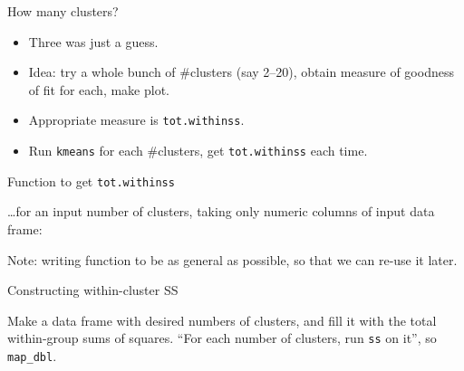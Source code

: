 \documentclass[ignorenonframetext,]{beamer}
\newenvironment{Shaded}{\begin{snugshade}}{\end{snugshade}}
\newcommand{\ControlFlowTok}[1]{\textcolor[rgb]{0.13,0.29,0.53}{\textbf{#1}}}
\newcommand{\DataTypeTok}[1]{\textcolor[rgb]{0.13,0.29,0.53}{#1}}
\newcommand{\DecValTok}[1]{\textcolor[rgb]{0.00,0.00,0.81}{#1}}
\newcommand{\KeywordTok}[1]{\textcolor[rgb]{0.13,0.29,0.53}{\textbf{#1}}}
\newcommand{\NormalTok}[1]{#1}
\newcommand{\OperatorTok}[1]{\textcolor[rgb]{0.81,0.36,0.00}{\textbf{#1}}}
\newcommand{\StringTok}[1]{\textcolor[rgb]{0.31,0.60,0.02}{#1}}
\begin{document}
\begin{frame}[fragile]{How many clusters?}
\protect\hypertarget{how-many-clusters}{}

\begin{itemize}
\item
  Three was just a guess.
\item
  Idea: try a whole bunch of \#clusters (say 2--20), obtain measure of
  goodness of fit for each, make plot.
\item
  Appropriate measure is \texttt{tot.withinss}.
\item
  Run \texttt{kmeans} for each \#clusters, get \texttt{tot.withinss}
  each time.
\end{itemize}

\end{frame}

\begin{frame}[fragile]{Function to get \texttt{tot.withinss}}
\protect\hypertarget{function-to-get-tot.withinss}{}

\ldots for an input number of clusters, taking only numeric columns of
input data frame:

\begin{Shaded}
\end{Shaded}

Note: writing function to be as general as possible, so that we can
re-use it later.

\end{frame}

\begin{frame}[fragile]{Constructing within-cluster SS}
\protect\hypertarget{constructing-within-cluster-ss}{}

Make a data frame with desired numbers of clusters, and fill it with the
total within-group sums of squares. ``For each number of clusters, run
\texttt{ss} on it'', so \texttt{map\_dbl}.

\normalsize

\begin{Shaded}
\end{Shaded}

\normalsize

\end{frame}
\end{document}
